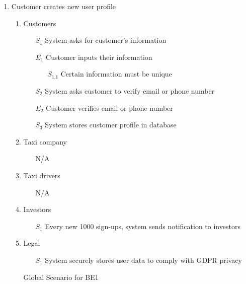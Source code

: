 \documentclass[]{article}
\begin{document}
\begin{enumerate}[{\textbf{BE}}1.]
    \item Customer creates new user profile
    \begin{enumerate}[{\textbf{VP}1}.1]
        \item Customers
            \begin{enumerate}
                \item[$S_1$] System asks for customer’s information
                \item[$E_1$] Customer inputs their information
                \begin{enumerate}
                    \item[$S_{1.1}$] Certain information must be unique
                \end{enumerate}
\color{blue}
                \item[$S_2$] System asks customer to verify email or phone number
                \item[$E_2$] Customer verifies email or phone number
\color{black}
                \item[$S_3$] System stores customer profile in database
            \end{enumerate}
        \item Taxi company
            \begin{enumerate}
                \item[N/A]
            \end{enumerate}
        \item Taxi drivers
            \begin{enumerate}
                \item[N/A]
            \end{enumerate}
        \item Investors
            \begin{enumerate}
	       \color{blue}
                \item[$S_1$] Every new 1000 sign-ups, system sends notification to investors
                \color{black}
            \end{enumerate}
        \item Legal
            \begin{enumerate}
                \item[$S_1$] System securely stores user data to comply with GDPR privacy
            \end{enumerate}
        \item[Global] Scenario for BE1

\end{enumerate}
\end{enumerate}
\end{document}
